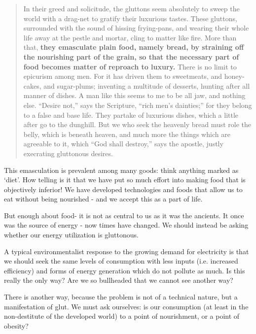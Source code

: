 \documentclass[letterpaper]{article}
\begin{document}
\begin{quote}
  In their greed and solicitude, the gluttons seem absolutely to sweep the world with a drag-net to gratify their luxurious tastes. These gluttons, surrounded with the sound of hissing frying-pans, and wearing their whole life away at the pestle and mortar, cling to matter like fire. More than that, \textbf{they emasculate plain food, namely bread, by straining off the nourishing part of the grain, so that the necessary part of food becomes matter of reproach to luxury.} There is no limit to epicurism among men. For it has driven them to sweetmeats, and honey-cakes, and sugar-plums; inventing a multitude of desserts, hunting after all manner of dishes. A man like this seems to me to be all jaw, and nothing else. “Desire not,” says the Scripture, “rich men’s dainties;” for they belong to a false and base life. They partake of luxurious dishes, which a little after go to the dunghill. But we who seek the heavenly bread must role the belly, which is beneath heaven, and much more the things which are agreeable to it, which “God shall destroy,” says the apostle, justly execrating gluttonous desires.
\end{quote}

This emasculation is prevalent among many goods: think anything marked as `diet'. How telling is it that we have put so much effort into making food that is objectively inferior! We have developed technologies and foods that allow us to eat without being nourished - and we accept this as a part of life.

But enough about food- it is not as central to us as it was the ancients. It once was the source of energy - now times have changed. We should instead be asking whether our energy utilization is gluttonous.

A typical environmentalist response to the growing demand for electricity is that we should seek the same levels of consumption with less inputs (i.e. increased efficiency) and forms of energy generation which do not pollute as much. Is this really the only way? Are we so bullheaded that we cannot see another way?

There is another way, because the problem is not of a technical nature, but a manifestation of glut. We must ask ourselves: is our consumption (at least in the non-destitute of the developed world) to a point of nourishment, or a point of obesity?

\end{document}
